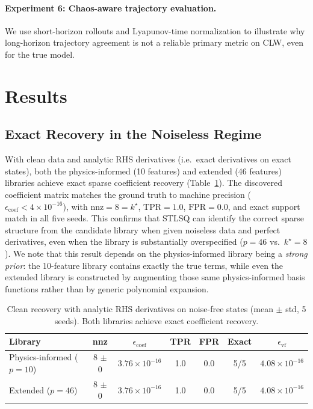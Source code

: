 \documentclass[12pt]{article}
\begin{document}
\paragraph{Experiment 6: Chaos-aware trajectory evaluation.}
We use short-horizon rollouts and Lyapunov-time normalization to illustrate why long-horizon trajectory agreement is not a reliable primary metric on CLW, even for the true model.


\section{Results}
\label{sec:results}

\subsection{Exact Recovery in the Noiseless Regime}

With clean data and analytic RHS derivatives (i.e.\ exact derivatives on exact states), both the physics-informed (10 features) and extended (46 features) libraries achieve exact sparse coefficient recovery (Table~\ref{tab:extended_clean}).
The discovered coefficient matrix matches the ground truth to machine precision ($\epsilon_\text{coef} < 4 \times 10^{-16}$), with $\text{nnz} = 8 = k^\star$, $\text{TPR} = 1.0$, $\text{FPR} = 0.0$, and exact support match in all five seeds.
This confirms that STLSQ can identify the correct sparse structure from the candidate library when given noiseless data and perfect derivatives, even when the library is substantially overspecified ($p=46$ vs.\ $k^\star=8$).
We note that this result depends on the physics-informed library being a \emph{strong prior}: the 10-feature library contains exactly the true terms, while even the extended library is constructed by augmenting those same physics-informed basis functions rather than by generic polynomial expansion.

\begin{table}[t]
\centering
\caption{Clean recovery with analytic RHS derivatives on noise-free states (mean $\pm$ std, 5 seeds). Both libraries achieve exact coefficient recovery.}
\label{tab:extended_clean}
\begin{tabular}{lcccccc}
\toprule
Library & nnz & $\epsilon_\text{coef}$ & TPR & FPR & Exact & $\epsilon_\text{vf}$ \\
\midrule
Physics-informed ($p{=}10$) & 8 $\pm$ 0 & $3.76 \times 10^{-16}$ & 1.0 & 0.0 & 5/5 & $4.08 \times 10^{-16}$ \\
Extended ($p{=}46$) & 8 $\pm$ 0 & $3.76 \times 10^{-16}$ & 1.0 & 0.0 & 5/5 & $4.08 \times 10^{-16}$ \\
\bottomrule
\end{tabular}
\end{table}
\end{document}

